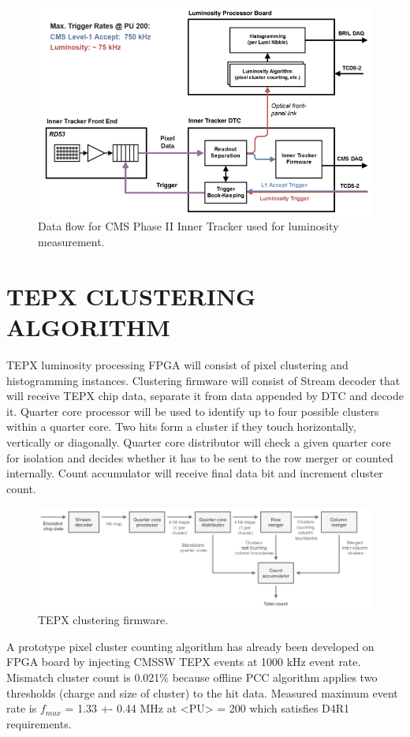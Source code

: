 \documentclass[a4paper,11pt]{article}
\begin{document}
\begin{figure}[htb]
  \centering
  \includegraphics[width=0.5\columnwidth]{TEPX_dataflow.png}
  \caption{Data flow for CMS Phase II Inner Tracker used for luminosity measurement. }
  \label{fig:CMS}
\end{figure}


\section{TEPX CLUSTERING ALGORITHM}
TEPX luminosity processing FPGA will consist of pixel clustering and histogramming instances. Clustering firmware will consist of
Stream decoder that will receive TEPX chip data, separate it from data appended by DTC and decode it. Quarter core processor will be used to identify up to four possible clusters within a quarter core. Two hits form a cluster if they touch horizontally, vertically or diagonally. Quarter core distributor will check a given quarter core for isolation and decides whether it has to be sent to the row merger or counted internally. Count accumulator will receive final data bit and increment cluster count.\\


\begin{figure}[htb]
  \centering
  \includegraphics[width=0.6\columnwidth]{CA.png}
  \caption{ TEPX clustering firmware.}
  \label{fig:CMS}
\end{figure}

A prototype pixel cluster counting algorithm has already been developed on FPGA board by injecting CMSSW TEPX events at 1000 kHz event rate. Mismatch cluster count is 0.021\% because offline PCC algorithm applies two thresholds (charge and size of cluster) to the hit data.
Measured maximum event rate is $f_{max}$ = 1.33 +- 0.44 MHz at <PU> = 200 which satisfies D4R1 requirements.
\end{document}
